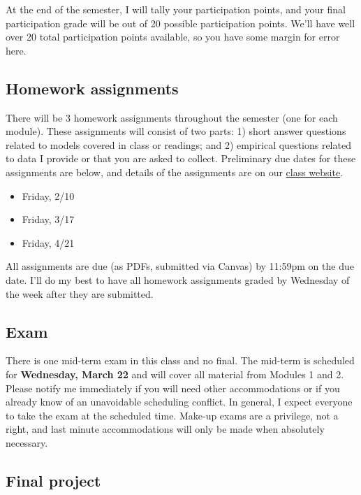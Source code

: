\documentclass[11pt,]{article}
\providecommand{\tightlist}{%
  \setlength{\itemsep}{0pt}\setlength{\parskip}{0pt}}
\begin{document}
At the end of the semester, I will tally your participation points, and
your final participation grade will be out of 20 possible participation
points. We'll have well over 20 total participation points available, so
you have some margin for error here.

\hypertarget{homework-assignments}{%
\subsection{Homework assignments}\label{homework-assignments}}

There will be 3 homework assignments throughout the semester (one for
each module). These assignments will consist of two parts: 1) short
answer questions related to models covered in class or readings; and 2)
empirical questions related to data I provide or that you are asked to
collect. Preliminary due dates for these assignments are below, and
details of the assignments are on our
\href{https://econ372s23.classes.ianmccarthyecon.com/}{class website}.

\begin{itemize}
\tightlist
\item
  Friday, 2/10
\item
  Friday, 3/17
\item
  Friday, 4/21
\end{itemize}

All assignments are due (as PDFs, submitted via Canvas) by 11:59pm on
the due date. I'll do my best to have all homework assignments graded by
Wednesday of the week after they are submitted.

\hypertarget{exam}{%
\subsection{Exam}\label{exam}}

There is one mid-term exam in this class and no final. The mid-term is
scheduled for \textbf{Wednesday, March 22} and will cover all material
from Modules 1 and 2. Please notify me immediately if you will need
other accommodations or if you already know of an unavoidable scheduling
conflict. In general, I expect everyone to take the exam at the
scheduled time. Make-up exams are a privilege, not a right, and last
minute accommodations will only be made when absolutely necessary.

\hypertarget{final-project}{%
\subsection{Final project}\label{final-project}}
\end{document}
